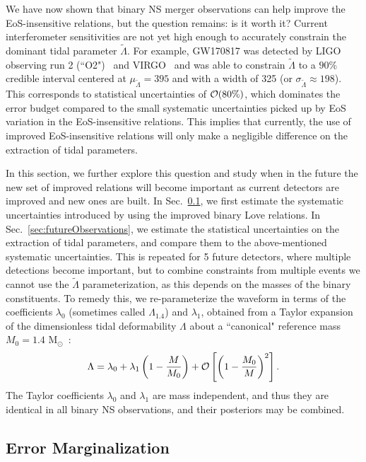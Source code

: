 \documentclass[prd,twocolumn,nofootinbib,superscriptaddress,amsmath,amssymb]{revtex4-1}
\begin{document}
We have now shown that binary NS merger observations can help improve the EoS-insensitive relations, but the question remains: is it worth it?
Current interferometer sensitivities are not yet high enough to accurately constrain the dominant tidal parameter $\tilde{\Lambda}$.
For example, GW170817 was detected by LIGO observing run 2 (``O2")~\cite{aLIGO} and VIRGO~\cite{TheVirgo:2014hva} and was able to constrain $\tilde{\Lambda}$ to a $90\%$ credible interval centered at $\mu_{\tilde{\Lambda}}=395$ and with a width of 325 (or $\sigma_{\tilde{\Lambda}} \approx 198$).  This corresponds to statistical uncertainties of ${\cal{O}}(80\%)$, which dominates the error budget compared to the small systematic uncertainties picked up by EoS variation in the EoS-insensitive relations.
This implies that currently, the use of improved EoS-insensitive relations will only make a negligible difference on the extraction of tidal parameters.

In this section, we further explore this question and study when in the future the new set of improved relations will become important as current detectors are improved and new ones are built. In Sec.~\ref{sec:marginalization}, we first estimate the systematic uncertainties introduced by using the improved binary Love relations.
In Sec.~\ref{sec:futureObservations}, we estimate the statistical uncertainties on the extraction of tidal parameters, and compare them to the above-mentioned systematic uncertainties.
This is repeated for 5 future detectors, where multiple detections become important, but to combine constraints from multiple events we cannot use the $\tilde\Lambda$ parameterization, as this depends on the masses of the binary constituents. To remedy this, we re-parameterize the waveform in terms of the coefficients $\lambda_0$ (sometimes called $\Lambda_{1.4}$) and $\lambda_1$, obtained from a Taylor expansion of the dimensionless tidal deformability $\Lambda$ about a ``canonical" reference mass $M_0=1.4\text{ M}_{\odot}$~\cite{delPozzo:TaylorTidal,Yagi:binLove}:
\begin{equation}
\Lambda = \lambda_0 + \lambda_1 \left(1-\frac{M}{M_0}\right) + {\cal{O}}\left[\left(1-\frac{M_{0}}{M}\right)^{2}\right].
\end{equation}
The Taylor coefficients $\lambda_0$ and $\lambda_1$ are mass independent, and thus they are identical in all binary NS observations, and their posteriors may be combined.

\subsection{Error Marginalization}\label{sec:marginalization}
\end{document}
